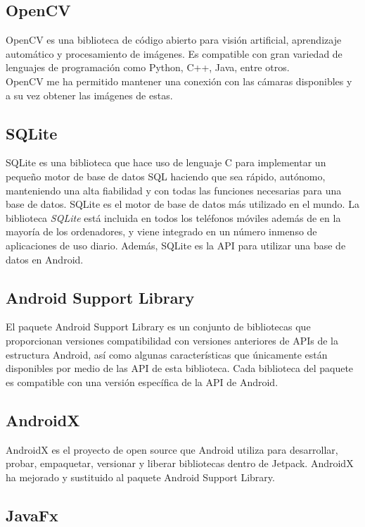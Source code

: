 \subsection{OpenCV}

OpenCV es una biblioteca de código abierto para visión artificial, aprendizaje automático y procesamiento de imágenes. Es compatible con gran variedad de lenguajes de programación como Python, C++, Java, entre otros.\\
OpenCV me ha permitido mantener una conexión con las cámaras disponibles y a su vez obtener las imágenes de estas.

\subsection{SQLite}

SQLite es una biblioteca que hace uso de lenguaje C para implementar un pequeño motor de base de datos SQL haciendo que sea rápido, autónomo, manteniendo una alta fiabilidad y con todas las funciones necesarias para una base de datos. SQLite es el motor de base de datos más utilizado en el mundo. La biblioteca \textit{SQLite} está incluida en todos los teléfonos móviles además de en la mayoría de los ordenadores, y viene integrado en un número inmenso de aplicaciones de uso diario. Además, SQLite es la API para utilizar una base de datos en Android.

\subsection{Android Support Library}

El paquete Android Support Library es un conjunto de bibliotecas que proporcionan versiones compatibilidad con versiones anteriores de APIs de la estructura Android, así como algunas características que únicamente están disponibles por medio de las API de esta biblioteca. Cada biblioteca del paquete es compatible con una versión específica de la API de Android.

\subsection{AndroidX}

AndroidX es el proyecto de open source que Android utiliza para desarrollar, probar, empaquetar, versionar y liberar bibliotecas dentro de Jetpack. AndroidX ha mejorado y sustituido al paquete Android Support Library.

\subsection{JavaFx}

